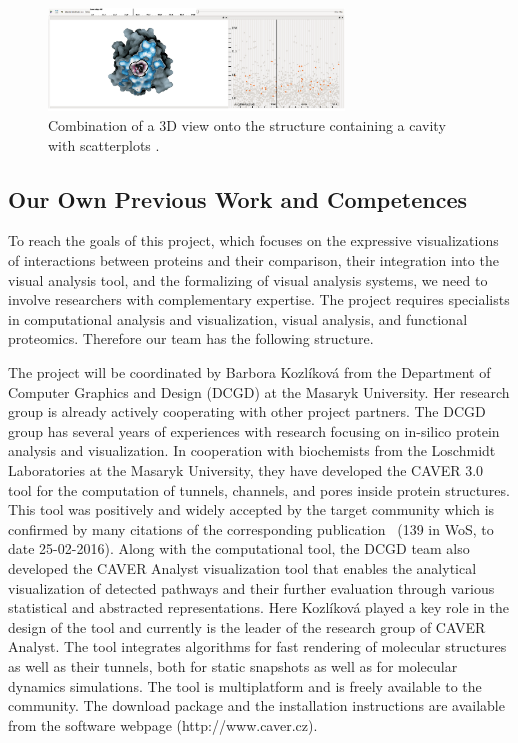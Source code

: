 \documentclass[11pt,a4paper,titlepage,oneside,onecolumn]{article}
\begin{document}
\setlength\intextsep{0pt}
\begin{figure}[ht]
\vspace{-5mm}
\centering
\includegraphics[width=0.7\textwidth]{pics/parulek2.png}
\vspace{-5mm}
\caption{Combination of a 3D view onto the structure containing a cavity with scatterplots \cite{parulek2012implicit}.}
\label{parulek}
\end{figure}

\subsection{Our Own Previous Work and Competences}
To reach the goals of this project, which focuses on the expressive visualizations of interactions between proteins and their comparison, their integration into the visual analysis tool, and the formalizing of visual analysis systems, we need to involve researchers with complementary expertise.
The project requires specialists in computational analysis and visualization, visual analysis, and functional proteomics.
Therefore our team has the following structure.

The project will be coordinated by Barbora Kozl\'{i}kov\'{a} from the Department of Computer Graphics and Design (DCGD) at the Masaryk University.
Her research group is already actively cooperating with other project partners. 
The DCGD group has several years of experiences with research focusing on in-silico protein analysis and visualization.
In cooperation with biochemists from the Loschmidt Laboratories at the Masaryk University, they have developed the CAVER 3.0~\cite{caver} tool for the computation of tunnels, channels, and pores inside protein structures. 
This tool was positively and widely accepted by the target community which is confirmed by many citations of the corresponding publication~\cite{caver} (139 in WoS, to date 25-02-2016).
Along with the computational tool, the DCGD team also developed the CAVER Analyst visualization tool \cite{analyst} that enables the analytical visualization of detected pathways and their further evaluation through various statistical and abstracted representations. 
Here Kozl\'{i}kov\'{a} played a key role in the design of the tool and currently is the leader of the research group of CAVER Analyst. 
The tool integrates algorithms for fast rendering of molecular structures as well as their tunnels, both for static snapshots as well as for molecular dynamics simulations. 
The tool is multiplatform and is freely available to the community.
The download package and the installation instructions are available from the software webpage (http://www.caver.cz). 
\end{document}
